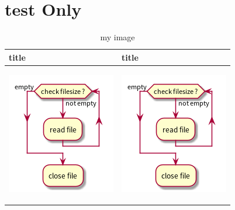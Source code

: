 \documentclass{article}
\begin{document}
\section{test Only}
\label{sec:orge40959c}
\begin{table}[htbp]
\caption{my image}
\centering
\begin{tabular}{p{}|p{}}
title & title\\[0pt]
\hline
\begin{center}
\includegraphics[width=.9\linewidth]{./imgs/test.png}
\end{center} & \begin{center}
\includegraphics[width=.9\linewidth]{./imgs/test.png}

\end{center}
\end{tabular}
\end{table}
\end{document}
